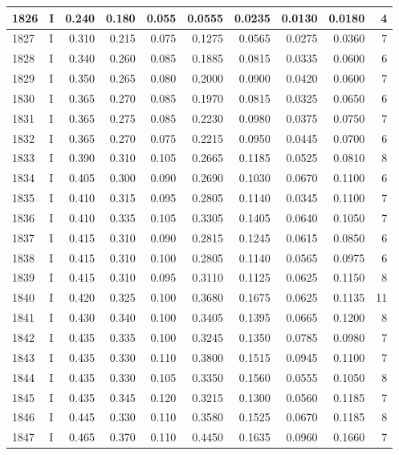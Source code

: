 \documentclass[9pt,twocolumn,twoside,]{pnas-new}
\begin{document}
\begin{tabular}{l|l|r|r|r|r|r|r|r|r}
\hline
1826 & I & 0.240 & 0.180 & 0.055 & 0.0555 & 0.0235 & 0.0130 & 0.0180 & 4\\
\hline
1827 & I & 0.310 & 0.215 & 0.075 & 0.1275 & 0.0565 & 0.0275 & 0.0360 & 7\\
\hline
1828 & I & 0.340 & 0.260 & 0.085 & 0.1885 & 0.0815 & 0.0335 & 0.0600 & 6\\
\hline
1829 & I & 0.350 & 0.265 & 0.080 & 0.2000 & 0.0900 & 0.0420 & 0.0600 & 7\\
\hline
1830 & I & 0.365 & 0.270 & 0.085 & 0.1970 & 0.0815 & 0.0325 & 0.0650 & 6\\
\hline
1831 & I & 0.365 & 0.275 & 0.085 & 0.2230 & 0.0980 & 0.0375 & 0.0750 & 7\\
\hline
1832 & I & 0.365 & 0.270 & 0.075 & 0.2215 & 0.0950 & 0.0445 & 0.0700 & 6\\
\hline
1833 & I & 0.390 & 0.310 & 0.105 & 0.2665 & 0.1185 & 0.0525 & 0.0810 & 8\\
\hline
1834 & I & 0.405 & 0.300 & 0.090 & 0.2690 & 0.1030 & 0.0670 & 0.1100 & 6\\
\hline
1835 & I & 0.410 & 0.315 & 0.095 & 0.2805 & 0.1140 & 0.0345 & 0.1100 & 7\\
\hline
1836 & I & 0.410 & 0.335 & 0.105 & 0.3305 & 0.1405 & 0.0640 & 0.1050 & 7\\
\hline
1837 & I & 0.415 & 0.310 & 0.090 & 0.2815 & 0.1245 & 0.0615 & 0.0850 & 6\\
\hline
1838 & I & 0.415 & 0.310 & 0.100 & 0.2805 & 0.1140 & 0.0565 & 0.0975 & 6\\
\hline
1839 & I & 0.415 & 0.310 & 0.095 & 0.3110 & 0.1125 & 0.0625 & 0.1150 & 8\\
\hline
1840 & I & 0.420 & 0.325 & 0.100 & 0.3680 & 0.1675 & 0.0625 & 0.1135 & 11\\
\hline
1841 & I & 0.430 & 0.340 & 0.100 & 0.3405 & 0.1395 & 0.0665 & 0.1200 & 8\\
\hline
1842 & I & 0.435 & 0.335 & 0.100 & 0.3245 & 0.1350 & 0.0785 & 0.0980 & 7\\
\hline
1843 & I & 0.435 & 0.330 & 0.110 & 0.3800 & 0.1515 & 0.0945 & 0.1100 & 7\\
\hline
1844 & I & 0.435 & 0.330 & 0.105 & 0.3350 & 0.1560 & 0.0555 & 0.1050 & 8\\
\hline
1845 & I & 0.435 & 0.345 & 0.120 & 0.3215 & 0.1300 & 0.0560 & 0.1185 & 7\\
\hline
1846 & I & 0.445 & 0.330 & 0.110 & 0.3580 & 0.1525 & 0.0670 & 0.1185 & 8\\
\hline
1847 & I & 0.465 & 0.370 & 0.110 & 0.4450 & 0.1635 & 0.0960 & 0.1660 & 7\\

\end{tabular}
\end{document}
